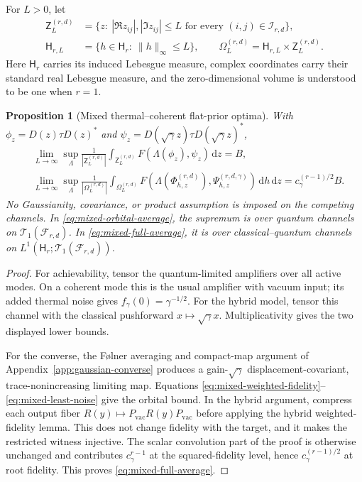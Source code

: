 \documentclass[11pt]{article}
\newtheorem{proposition}[proposition]{Proposition}
\theoremstyle{remark}
\theoremstyle{plain}
\newcommand{\cF}{\mathcal F}
\newcommand{\cT}{\mathcal T}
\newcommand{\dd}{\mathrm d}
\begin{document}
For \(L>0\), let
\begin{align*}
  \mathsf Z_L^{(r,d)}
  &=\{z:\ |\Re z_{ij}|,|\Im z_{ij}|\le L
          \text{ for every }(i,j)\in\mathcal I_{r,d}\},\\
  \mathsf H_{r,L}
  &=\{h\in\mathsf H_r:\ \|h\|_\infty\le L\},
  \qquad
  \Omega_L^{(r,d)}=\mathsf H_{r,L}\times\mathsf Z_L^{(r,d)}.
\end{align*}
Here \(\mathsf H_r\) carries its induced Lebesgue measure, complex
coordinates carry their standard real Lebesgue measure, and the
zero-dimensional volume is understood to be one when \(r=1\).

\begin{proposition}[Mixed thermal--coherent flat-prior optima]
\label{prop:mixed-gaussian}
With \(\phi_z=D(z)\tau D(z)^*\) and
\(\psi_z=D(\sqrt\gamma z)\tau D(\sqrt\gamma z)^*\),
\begin{align}
 &\lim_{L\to\infty}\sup_\Lambda
  \frac1{|\mathsf Z_L^{(r,d)}|}
  \int_{\mathsf Z_L^{(r,d)}}
  F\!\left(\Lambda(\phi_z),\psi_z\right)\,\dd z
  =B,
  \label{eq:mixed-orbital-average}\\
 &\lim_{L\to\infty}\sup_\Lambda
  \frac1{|\Omega_L^{(r,d)}|}
  \int_{\Omega_L^{(r,d)}}
  F\!\left(\Lambda(\Phi_{h,z}^{(r,d)}),
                 \Psi_{h,z}^{(r,d,\gamma)}\right)\,\dd h\,\dd z
  =c_\gamma^{(r-1)/2}B.
  \label{eq:mixed-full-average}
\end{align}
No Gaussianity, covariance, or product assumption is imposed on the
competing channels.  In \eqref{eq:mixed-orbital-average}, the supremum is
over quantum channels on \(\cT_1(\cF_{r,d})\).  In
\eqref{eq:mixed-full-average}, it is over classical--quantum channels on
\(L^1(\mathsf H_r;\cT_1(\cF_{r,d}))\).
\end{proposition}

\begin{proof}
For achievability, tensor the quantum-limited amplifiers over all active
modes.  On a coherent mode this is the usual amplifier with vacuum input;
its added thermal noise gives \(f_\gamma(0)=\gamma^{-1/2}\).  For the hybrid
model, tensor this channel with the classical pushforward
\(x\mapsto\sqrt\gamma x\).  Multiplicativity gives the two displayed lower
bounds.

For the converse, the F{\o}lner averaging and compact-map argument of
Appendix~\ref{app:gaussian-converse} produces a gain-\(\sqrt\gamma\)
displacement-covariant,
trace-nonincreasing limiting map.  Equations
\eqref{eq:mixed-weighted-fidelity}--\eqref{eq:mixed-least-noise} give the
orbital bound.  In the hybrid argument, compress each output fiber
\(R(y)\mapsto P_{\mathrm{vac}}R(y)P_{\mathrm{vac}}\) before applying the
hybrid weighted-fidelity lemma.  This does not change fidelity with the
target, and it makes the restricted witness injective.  The scalar
convolution part of the proof is otherwise unchanged and contributes
\(c_\gamma^{r-1}\) at the squared-fidelity level, hence
\(c_\gamma^{(r-1)/2}\) at root fidelity.  This proves
\eqref{eq:mixed-full-average}.
\end{proof}
\end{document}
